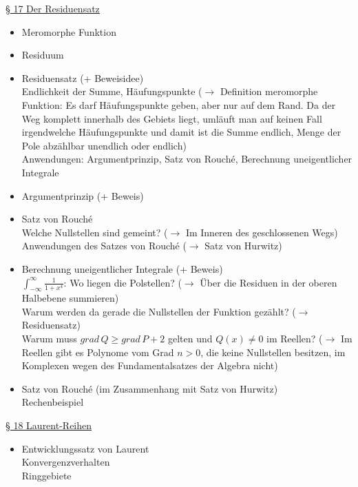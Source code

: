 \documentclass[11pt]{article}
\begin{document}
\underline{§ 17 Der Residuensatz}
\vspace{-0.5cm}
\begin{itemize}
\item Meromorphe Funktion
\item Residuum
\item Residuensatz (+ Beweisidee) \\
\quad Endlichkeit der Summe, Häufungspunkte ($\rightarrow$ Definition meromorphe Funktion: Es darf Häufungspunkte geben, aber nur auf dem Rand. Da der Weg komplett innerhalb des Gebiets liegt, umläuft man auf keinen Fall irgendwelche Häufungspunkte und damit ist die Summe endlich, Menge der Pole abzählbar unendlich oder endlich) \\
\quad Anwendungen: Argumentprinzip, Satz von Rouché, Berechnung uneigentlicher Integrale
\item Argumentprinzip (+ Beweis)
\item Satz von Rouché \\
\quad Welche Nullstellen sind gemeint? ($\rightarrow$ Im Inneren des geschlossenen Wegs)\\
\quad Anwendungen des Satzes von Rouché ($\rightarrow$ Satz von Hurwitz)
\item Berechnung uneigentlicher Integrale (+ Beweis) \\
\quad $\int_{-\infty}^{\infty} \frac{1}{1+x^4}$: Wo liegen die Polstellen? ($\rightarrow$ Über die Residuen in der oberen Halbebene summieren) \\
\quad Warum werden da gerade die Nullstellen der Funktion gezählt? ($\rightarrow$ Residuensatz) \\
\quad Warum muss $grad \, Q \geq grad \, P +2$ gelten und $Q(x) \neq 0$ im Reellen? ($\rightarrow$ Im Reellen gibt es Polynome vom Grad $n > 0$, die keine Nullstellen besitzen, im Komplexen wegen des Fundamentalsatzes der Algebra nicht)

\item Satz von Rouché (im Zusammenhang mit Satz von Hurwitz) \\
\quad Rechenbeispiel
\end{itemize}

\underline{§ 18 Laurent-Reihen}
\vspace{-0.5cm}
\begin{itemize}
\item Entwicklungssatz von Laurent \\
\quad Konvergenzverhalten \\
\quad Ringgebiete
\end{itemize}
\end{document}
